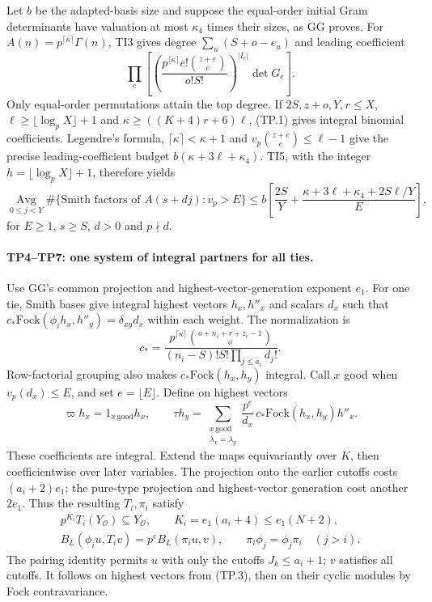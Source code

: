 Let $b$ be the adapted-basis size and suppose the equal-order initial Gram
determinants have valuation at most $\kappa_4$ times their sizes, as GG
proves. For $A(n)=p^{\lceil\kappa\rceil}\Gamma(n)$, TI3 gives degree
$\sum_u(S+o-e_u)$ and leading coefficient
\[
 \prod_e\left[
 \left(\frac{p^{\lceil\kappa\rceil}e!\binom{z+e}e}{o!S!}\right)^{|I_e|}
 \det G_e\right].
\]
Only equal-order permutations attain the top degree. If
$2S,z+o,Y,r\le X$,
$\ell\ge\lfloor\log_pX\rfloor+1$ and
$\kappa\ge((K+4)r+6)\ell$, (TP.1) gives integral binomial coefficients.
Legendre's formula, $\lceil\kappa\rceil<\kappa+1$ and
$v_p\binom{z+e}e\le\ell-1$ give the precise leading-coefficient budget
$b(\kappa+3\ell+\kappa_4)$. TI5, with the integer
$h=\lfloor\log_pX\rfloor+1$, therefore yields
\[
 \underset{0\le j<Y}{\operatorname{Avg}}
 \#\{\text{Smith factors of }A(s+dj):v_p>E\}
 \le b\left[\frac{2S}{Y}
 +\frac{\kappa+3\ell+\kappa_4+2S\ell/Y}{E}\right],
 \tag{TP.2}
\]
for $E\ge1$, $s\ge S$, $d>0$ and $p\nmid d$.

\paragraph{TP4--TP7: one system of integral partners for all ties.}
Use GG's common projection and highest-vector-generation exponent $e_1$.
For one tie, Smith bases give integral highest vectors $h_x,h''_x$ and
scalars $d_x$ such that
$c_*\mathrm{Fock}(\phi_i h_x,h''_y)=\delta_{xy}d_x$ within each weight.
The normalization is
\[
 c_*=
 \frac{p^{\lceil\kappa\rceil}\binom{o+n_i+r+z_i-1}o}
 {(n_i-S)!S!\prod_{j\le a_i}d_j!}.
\]
Row-factorial grouping also makes $c_*\mathrm{Fock}(h_x,h_y)$ integral.
Call $x$ good when $v_p(d_x)\le E$, and set $e=\lfloor E\rfloor$.
Define on highest vectors
\[
 \varpi h_x=1_{x\,\mathrm{good}}h_x,\qquad
 \tau h_y=
 \sum_{\substack{x\,\mathrm{good}\\\lambda_x=\lambda_y}}
 \frac{p^e}{d_x}\,c_*\mathrm{Fock}(h_x,h_y)h''_x.
 \tag{TP.3}
\]
These coefficients are integral. Extend the maps equivariantly over $K$,
then coefficientwise over later variables. The projection onto the earlier
cutoffs costs $(a_i+2)e_1$; the pure-type projection and highest-vector
generation cost another $2e_1$. Thus the resulting $T_i,\pi_i$ satisfy
\[
 \begin{gathered}
 p^{K_i}T_i(Y_{\mathcal O})\subseteq Y_{\mathcal O},
 \qquad K_i=e_1(a_i+4)\le e_1(N+2),\\
 B_L(\phi_i u,T_i v)=p^eB_L(\pi_i u,v),
 \qquad \pi_i\phi_j=\phi_j\pi_i\quad(j>i).
 \end{gathered}
 \tag{TP.4}
\]
The pairing identity permits $u$ with only the cutoffs
$J_k\le a_i+1$; $v$ satisfies all cutoffs. It follows on highest vectors
from (TP.3), then on their cyclic modules by Fock contravariance.

